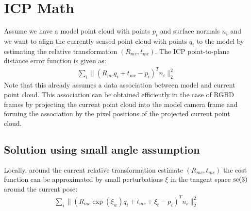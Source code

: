 \section{ICP Math}

Assume we have a model point cloud with points $p_i$ and surface
normals $n_i$ and we want to align the currently sensed point cloud
with points $q_i$ to the model by estimating the relative
transformation $(R_{mc}, t_{mc})$. The ICP point-to-plane distance
error function is given as:
\begin{align}
  \sum_i \| ( R_{mc} q_i + t_{mc} - p_i )^T n_i \|^2_2
\end{align}
Note that this already assumes a data association between model and current point cloud.
This association can be obtained efficiently in the case of RGBD frames
by projecting the current point cloud into the model camera frame and
forming the association by the pixel positions of the projected current point cloud.

\subsection{Solution using small angle assumption}
Locally, around the current relative transformation estimate $(R_{mc},
t_{mc})$ the cost function can be approximated by small perturbations $\xi$
in the tangent space $\mathrm{se(3)}$ around the current pose:
\begin{align}
  \sum_i \| ( R_{mc} \exp(\xi_w) q_i + t_{mc} + \xi_t - p_i )^T n_i \|^2_2
\end{align}

